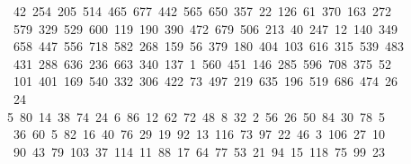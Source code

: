 \begin{tabbing}
\ 42\ 254\ 205\ 514\ 465\ 677\ 442\ 565\ 650\ 357\ 22\ 126\ 61\ 370\ 163\ 272\ \\[0pt]
\ 579\ 329\ 529\ 600\ 119\ 190\ 390\ 472\ 679\ 506\ 213\ 40\ 247\ 12\ 140\ 349\\[0pt]
\>\ 658\ 447\ 556\ 718\ 582\ 268\ 159\ 56\ 379\ 180\ 404\ 103\ 616\ 315\ 539\ 483\ \\[0pt]
\ 431\ 288\ 636\ 236\ 663\ 340\ 137\ 1\ 560\ 451\ 146\ 285\ 596\ 708\ 375\ 52\ \\[0pt]
\ 101\ 401\ 169\ 540\ 332\ 306\ 422\ 73\ 497\ 219\ 635\ 196\ 519\ 686\ 474\ 26\\[0pt]
\ 24\ \\[0pt]
5\ 80\ 14\ 38\ 74\ 24\ 6\ 86\ 12\ 62\ 72\ 48\ 8\ 32\ 2\ 56\ 26\ 50\ 84\ 30\ 78\ 5\\[0pt]
\ 36\ 60\ 5\ 82\ 16\ 40\ 76\ 29\ 19\ 92\ 13\ 116\ 73\ 97\ 22\ 46\ 3\ 106\ 27\ 10\\[0pt]
\ 90\ 43\ 79\ 103\ 37\ 114\ 11\ 88\ 17\ 64\ 77\ 53\ 21\ 94\ 15\ 118\ 75\ 99\ 23\\[0pt]

\end{tabbing}
